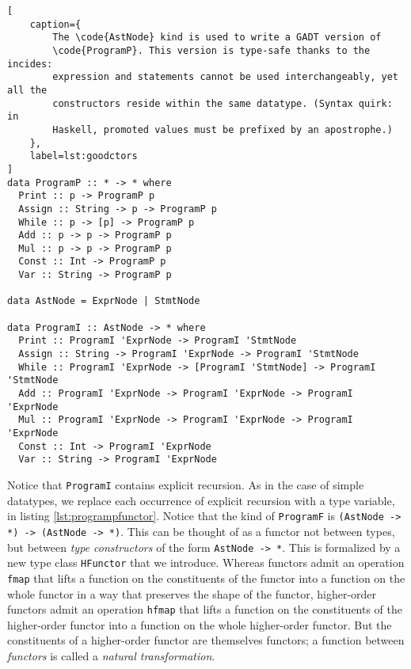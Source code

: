 \documentclass[letterpaper,11pt]{article}
\newcommand{\code}{\texttt}
\begin{document}
\begin{lstlisting}[
    caption={
        The \code{AstNode} kind is used to write a GADT version of
        \code{ProgramP}. This version is type-safe thanks to the incides:
        expression and statements cannot be used interchangeably, yet all the
        constructors reside within the same datatype. (Syntax quirk: in
        Haskell, promoted values must be prefixed by an apostrophe.)
    },
    label=lst:goodctors
]
data ProgramP :: * -> * where
  Print :: p -> ProgramP p
  Assign :: String -> p -> ProgramP p
  While :: p -> [p] -> ProgramP p
  Add :: p -> p -> ProgramP p
  Mul :: p -> p -> ProgramP p
  Const :: Int -> ProgramP p
  Var :: String -> ProgramP p

data AstNode = ExprNode | StmtNode

data ProgramI :: AstNode -> * where
  Print :: ProgramI 'ExprNode -> ProgramI 'StmtNode
  Assign :: String -> ProgramI 'ExprNode -> ProgramI 'StmtNode
  While :: ProgramI 'ExprNode -> [ProgramI 'StmtNode] -> ProgramI 'StmtNode
  Add :: ProgramI 'ExprNode -> ProgramI 'ExprNode -> ProgramI 'ExprNode
  Mul :: ProgramI 'ExprNode -> ProgramI 'ExprNode -> ProgramI 'ExprNode
  Const :: Int -> ProgramI 'ExprNode
  Var :: String -> ProgramI 'ExprNode
\end{lstlisting}

Notice that \code{ProgramI} contains explicit recursion. As in the case of
simple datatypes, we replace each occurrence of explicit recursion with a type
variable, in listing \ref{lst:programpfunctor}. Notice that the kind of
\code{ProgramF} is \code{(AstNode -> *) -> (AstNode -> *)}. This can be thought
of as a functor not between types, but between \emph{type constructors} of the
form \code{AstNode -> *}. This is formalized by a new type class
\code{HFunctor} that we introduce. Whereas functors admit an operation
\code{fmap} that lifts a function on the constituents of the functor into a
function on the whole functor in a way that preserves the shape of the functor,
higher-order functors admit an operation \code{hfmap} that lifts a function on
the constituents of the higher-order functor into a function on the whole
higher-order functor. But the constituents of a higher-order functor are
themselves functors; a function between \emph{functors} is called a
\emph{natural transformation}.
\end{document}
